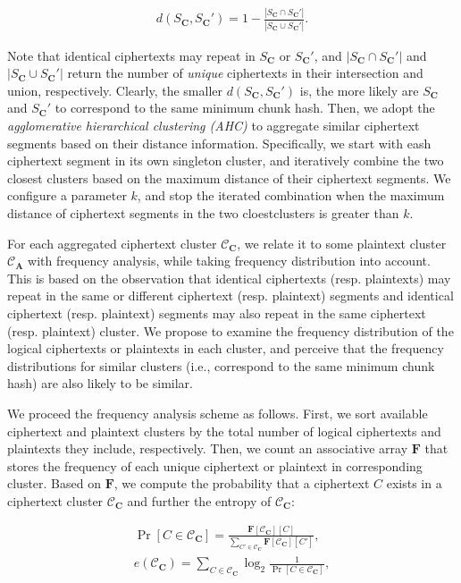 \begin{eqnarray}
d(S_\mathbf{C}, S_\mathbf{C}') = 1 - \frac{|S_\mathbf{C} \cap S_\mathbf{C}'|}{|S_\mathbf{C} \cup S_\mathbf{C}'|}. \nonumber
\end{eqnarray}

Note that identical ciphertexts may repeat in $S_\mathbf{C}$ or $S_\mathbf{C}'$, and $|S_\mathbf{C} \cap S_\mathbf{C}'|$ and $|S_\mathbf{C} \cup S_\mathbf{C}'|$ return the number of {\em unique} ciphertexts in their  intersection and union, respectively. Clearly,  the smaller $d(S_\mathbf{C}, S_\mathbf{C}')$ is, the more likely are $S_\mathbf{C}$ and $S_\mathbf{C}'$ to correspond to the same minimum chunk hash. Then, we adopt the {\em agglomerative hierarchical clustering (AHC)} \cite{johnson67} to aggregate similar ciphertext segments based on their distance information.  Specifically, we start with eash ciphertext segment in its own singleton cluster, and iteratively combine the two closest clusters based on the maximum distance of their ciphertext segments. We configure a parameter $k$, and stop the iterated combination when the maximum distance of ciphertext segments in the two cloestclusters is greater than $k$.  

For each aggregated ciphertext cluster $\mathcal{C}_\mathbf{C}$, we relate it to some plaintext cluster $\mathcal{C}_\mathbf{A}$ with frequency analysis, while taking frequency distribution into account. This is based on the observation that identical ciphertexts (resp. plaintexts) may  repeat in the same or different ciphertext (resp. plaintext) segments and identical ciphertext (resp. plaintext) segments may also repeat in the same ciphertext (resp. plaintext) cluster. We propose to examine the frequency distribution of the logical ciphertexts or plaintexts in each cluster, and perceive that the frequency distributions for similar clusters (i.e., correspond to the same minimum chunk hash) are also likely to be similar. 
 
We proceed the frequency analysis scheme as follows. First, we  sort available ciphertext and plaintext clusters by the total number of logical  ciphertexts and plaintexts they include, respectively. Then, we count an associative array $\mathbf{F}$ that stores the frequency of each unique ciphertext or plaintext in  corresponding cluster. Based on $\mathbf{F}$, we compute the probability that a  ciphertext $C$ exists in a ciphertext cluster $\mathcal{C}_\mathbf{C}$ and further the entropy of $\mathcal{C}_\mathbf{C}$:        

\begin{eqnarray*}
    \Pr[C \in \mathcal{C}_\mathbf{C}] = \frac{\mathbf{F}[\mathcal{C}_\mathbf{C}][C]}{\sum_{C' \in \mathcal{C}_\mathbf{C}} \mathbf{F}[\mathcal{C}_\mathbf{C}][C']}, \\
    e(\mathcal{C}_\mathbf{C}) = \sum_{C \in \mathcal{C}_\mathbf{C}} \log_2 \frac{1}{\Pr[C \in \mathcal{C}_\mathbf{C}]},  
\end{eqnarray*}

